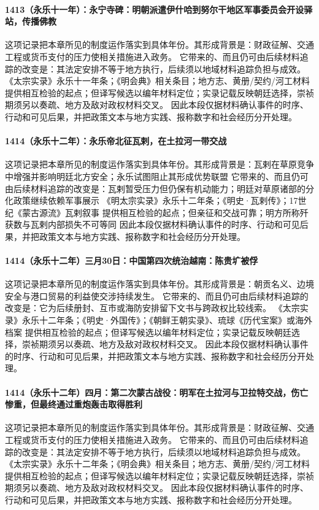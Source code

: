 \paragraph{1413（永乐十一年）：永宁寺碑：明朝派遣伊什哈到努尔干地区军事委员会开设驿站，传播佛教} 这项记录把本章所见的制度运作落实到具体年份。其形成背景是：财政征解、交通工程或货币支付的压力使相关措施进入政务。 它带来的、而且仍可由后续材料追踪的改变是：其法定安排不等于地方执行，后续须以地域材料追踪负担与成效。 《太宗实录》永乐十一年条；《明会典》相关条目；地方志、黄册/契约/河工材料 提供相互检验的起点；但译写候选以编年材料定位；实录记载反映朝廷选择，崇祯期须另以奏疏、地方及敌对政权材料交叉。 因此本段仅据材料确认事件的时序、行动和可见后果，并把政策文本与地方实践、报称数字和社会经历分开处理。

\paragraph{1414（永乐十二年）：永乐帝北征瓦剌，在土拉河一带交战} 这项记录把本章所见的制度运作落实到具体年份。其形成背景是：瓦剌在草原竞争中增强并影响明廷北方安全；永乐试图阻止其形成优势联盟 它带来的、而且仍可由后续材料追踪的改变是：瓦剌暂受压力但仍保有机动能力；明廷对草原诸部的分化政策继续依赖军事展示 《明太宗实录》永乐十二年条；《明史·瓦剌传》；17世纪《蒙古源流》瓦剌叙事 提供相互检验的起点；但亲征和交战可靠；明方所称歼获数与瓦剌内部损失不可等同 因此本段仅据材料确认事件的时序、行动和可见后果，并把政策文本与地方实践、报称数字和社会经历分开处理。

\paragraph{1414（永乐十二年）三月30日：中国第四次统治越南：陈贵圹被俘} 这项记录把本章所见的制度运作落实到具体年份。其形成背景是：朝贡名义、边境安全与港口贸易的利益使交涉持续发生。 它带来的、而且仍可由后续材料追踪的改变是：它为后续册封、互市或海防安排留下文书与跨政权比较线索。 《太宗实录》永乐十二年条；《明史·外国传》；《朝鲜王朝实录》、琉球《历代宝案》或海外档案 提供相互检验的起点；但译写候选以编年材料定位；实录记载反映朝廷选择，崇祯期须另以奏疏、地方及敌对政权材料交叉。 因此本段仅据材料确认事件的时序、行动和可见后果，并把政策文本与地方实践、报称数字和社会经历分开处理。

\paragraph{1414（永乐十二年）四月：第二次蒙古战役：明军在土拉河与卫拉特交战，伤亡惨重，但最终通过重炮轰击取得胜利} 这项记录把本章所见的制度运作落实到具体年份。其形成背景是：财政征解、交通工程或货币支付的压力使相关措施进入政务。 它带来的、而且仍可由后续材料追踪的改变是：其法定安排不等于地方执行，后续须以地域材料追踪负担与成效。 《太宗实录》永乐十二年条；《明会典》相关条目；地方志、黄册/契约/河工材料 提供相互检验的起点；但译写候选以编年材料定位；实录记载反映朝廷选择，崇祯期须另以奏疏、地方及敌对政权材料交叉。 因此本段仅据材料确认事件的时序、行动和可见后果，并把政策文本与地方实践、报称数字和社会经历分开处理。

